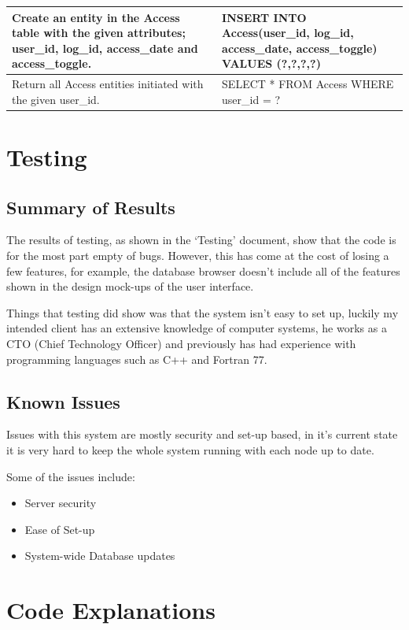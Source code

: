 \documentclass[a4paper]{article}
\begin{document}
\begin{table}[H]
\begin{tabular}{|p{5cm}|p{8cm}|}
        Create an entity in the Access table with the given attributes; user\_id, log\_id, access\_date and access\_toggle. & INSERT INTO Access(user\_id, log\_id, access\_date, access\_toggle) VALUES (?,?,?,?) \\ \hline
        Return all Access entities initiated with the given user\_id.                                                   & SELECT * FROM Access WHERE user\_id = ?                                          \\ \hline
        \end{tabular}
    \end{table}

\section{Testing}
    \subsection{Summary of Results}
        The results of testing, as shown in the `Testing' document, show that the code is for the most part empty of bugs. However, this
        has come at the cost of losing a few features, for example, the database browser doesn't include all of the features shown in the 
        design mock-ups of the user interface.

        Things that testing did show was that the system isn't easy to set up, luckily my intended client has an extensive knowledge of
        computer systems, he works as a CTO (Chief Technology Officer) and previously has had experience with programming languages such as
        C++ and Fortran 77.
    \subsection{Known Issues}
        Issues with this system are mostly security and set-up based, in it's current state it is very hard to keep the whole system running
        with each node up to date. 

        Some of the issues include:
        \begin{itemize}
            \item Server security
            \item Ease of Set-up
            \item System-wide Database updates
        \end{itemize}

\section{Code Explanations}
\end{document}
